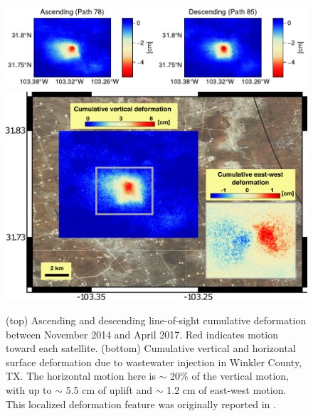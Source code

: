\begin{figure}
	\centering
	\includegraphics[width=\textwidth]{figures/chapter3-sar/ch3-injection-asc-desc.pdf}
	\includegraphics[width=\textwidth]{figures/chapter3-sar/ch3-injection-kim-lu}
	\caption[Vertical and horizontal deformation near Winkler County, TX]{
	(top) Ascending and descending line-of-sight cumulative deformation between November 2014 and April 2017. Red indicates motion toward each satellite.
	(bottom) Cumulative vertical and horizontal surface deformation due to wastewater injection in Winkler County, TX. The horizontal motion here is $\sim$ 20\% of the vertical motion, with up to $\sim$ 5.5 cm of uplift and $\sim$ 1.2 cm of east-west motion. This localized deformation feature was originally reported in \cite{Kim2018AssociationLocalizedGeohazards}.}
	\label{fig:injection-kim-lu}
\end{figure}



%
%
%

